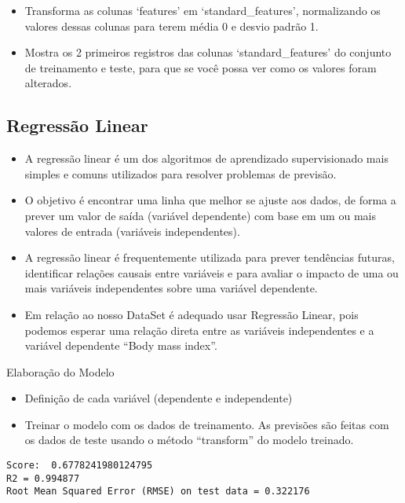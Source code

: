 \documentclass[11pt]{article}
\providecommand{\tightlist}{%
      \setlength{\itemsep}{0pt}\setlength{\parskip}{0pt}}
\begin{document}
    \begin{itemize}
\tightlist
\item
  Transforma as colunas `features' em `standard\_features', normalizando
  os valores dessas colunas para terem média 0 e desvio padrão 1.
\item
  Mostra os 2 primeiros registros das colunas `standard\_features' do
  conjunto de treinamento e teste, para que se você possa ver como os
  valores foram alterados.
\end{itemize}

    \hypertarget{regressuxe3o-linear}{%
\subsection{Regressão Linear}\label{regressuxe3o-linear}}

    \begin{itemize}
\tightlist
\item
  A regressão linear é um dos algoritmos de aprendizado supervisionado
  mais simples e comuns utilizados para resolver problemas de previsão.
\item
  O objetivo é encontrar uma linha que melhor se ajuste aos dados, de
  forma a prever um valor de saída (variável dependente) com base em um
  ou mais valores de entrada (variáveis independentes).
\item
  A regressão linear é frequentemente utilizada para prever tendências
  futuras, identificar relações causais entre variáveis e para avaliar o
  impacto de uma ou mais variáveis independentes sobre uma variável
  dependente.
\item
  Em relação ao nosso DataSet é adequado usar Regressão Linear, pois
  podemos esperar uma relação direta entre as variáveis independentes e
  a variável dependente ``Body mass index''.
\end{itemize}
Elaboração do Modelo

    \begin{itemize}
\tightlist
\item
  Definição de cada variável (dependente e independente)
\item
  Treinar o modelo com os dados de treinamento. As previsões são feitas
  com os dados de teste usando o método ``transform'' do modelo
  treinado.
\end{itemize}


    \begin{Verbatim}[commandchars=\\\{\}]
Score:  0.6778241980124795
R2 = 0.994877
Root Mean Squared Error (RMSE) on test data = 0.322176
    \end{Verbatim}
\end{document}
